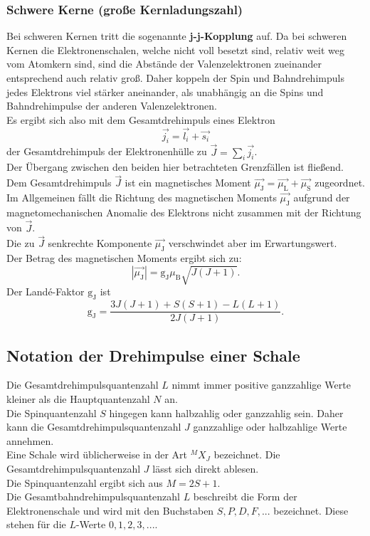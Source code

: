 \subsubsection{Schwere Kerne (große Kernladungszahl)}
Bei schweren Kernen tritt die sogenannte \textbf{j-j-Kopplung} auf.
Da bei schweren Kernen die Elektronenschalen, welche nicht voll besetzt sind, relativ weit weg vom Atomkern sind, sind die Abstände der Valenzelektronen zueinander entsprechend auch relativ groß. Daher koppeln der Spin und Bahndrehimpuls jedes Elektrons viel stärker aneinander, als unabhängig an die Spins und Bahndrehimpulse der anderen Valenzelektronen.\\
Es ergibt sich also mit dem Gesamtdrehimpuls eines Elektron
\begin{equation}
  \vec{j_i}=\vec{l_i}+\vec{s_i}
\end{equation}
der Gesamtdrehimpuls der Elektronenhülle zu $\vec{J}=\sum_i{\vec{j_i}}$.\\
Der Übergang zwischen den beiden hier betrachteten Grenzfällen ist fließend.
\\
Dem Gesamtdrehimpuls $\vec{J}$ ist ein magnetisches Moment $\vec{\mu_{\mathrm{J}}}=\vec{\mu_{\mathrm{L}}}+\vec{\mu_{\mathrm{S}}}$ zugeordnet.\\
Im Allgemeinen fällt die Richtung des magnetischen Moments $\vec{\mu_{\mathrm{J}}}$ aufgrund der magnetomechanischen Anomalie des Elektrons nicht zusammen mit der Richtung von $\vec{J}$.\\
Die zu $\vec{J}$ senkrechte Komponente $\vec{\mu_{\mathrm{J}}}$ verschwindet aber im Erwartungswert.\\
Der Betrag des magnetischen Moments ergibt sich zu:
\begin{equation}
  |\vec{\mu_{\mathrm{J}}}|=\mathrm{g_J}\mu_{\mathrm{B}}\sqrt{J(J+1)}\mathrm{.}
\end{equation}
Der Landé-Faktor $\mathrm{g_J}$ ist
\begin{equation}
  \label{eqn:lande}
  \mathrm{g_J}=\frac{3J(J+1)+S(S+1)-L(L+1)}{2J(J+1)}\mathrm{.}
\end{equation}
\subsection{Notation der Drehimpulse einer Schale}
Die Gesamtdrehimpulsquantenzahl $L$ nimmt immer positive ganzzahlige Werte kleiner als die Hauptquantenzahl $N$ an.\\
Die Spinquantenzahl $S$ hingegen kann halbzahlig oder ganzzahlig sein. Daher kann die Gesamtdrehimpulsquantenzahl $J$ ganzzahlige oder halbzahlige Werte annehmen.\\
Eine Schale wird üblicherweise in der Art ${^{M}X_J}$ bezeichnet.
Die Gesamtdrehimpulsquantenzahl $J$ lässt sich direkt ablesen. \\
Die Spinquantenzahl ergibt sich aus $M=2S+1$. \\
Die Gesamtbahndrehimpulsquantenzahl $L$ beschreibt die Form der Elektronenschale und wird mit den Buchstaben $S,P,D,F,...$ bezeichnet. Diese stehen für die $L$-Werte $0,1,2,3,...$.

